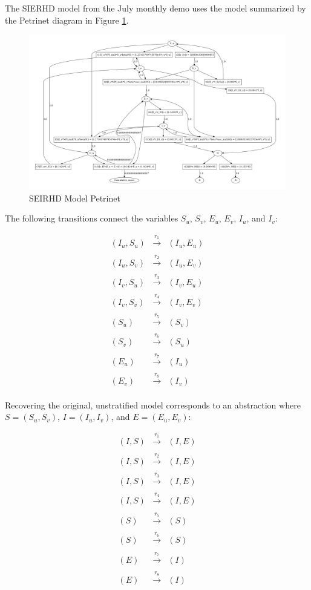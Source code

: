 The SIERHD model from the July monthly demo uses the model summarized by the Petrinet diagram in Figure \ref{fig:seirhd}.

\begin{figure}
    \includegraphics[width=\linewidth]{fig/seirhd}
    \caption{\label{fig:seirhd} SEIRHD Model Petrinet}
\end{figure}

The following transitions connect the variables $S_u$, $S_v$, $E_u$, $E_v$, $I_u$, and $I_v$:

\begin{eqnarray*}
    (I_u, S_u) &\xrightarrow[]{r_1}& (I_u, E_u)\\
    (I_u, S_v) &\xrightarrow[]{r_2}& (I_u, E_v)\\
    (I_v, S_u) &\xrightarrow[]{r_3}& (I_v, E_u)\\
    (I_v, S_v) &\xrightarrow[]{r_4}& (I_v, E_v)\\
    (S_u) &\xrightarrow[]{r_5}& (S_v)\\
    (S_v) &\xrightarrow[]{r_6}& (S_u)\\
    (E_u) &\xrightarrow[]{r_7}& (I_u)\\
    (E_v) &\xrightarrow[]{r_8}& (I_v)
\end{eqnarray*}

Recovering the original, unstratified model corresponds to an abstraction where $S = (S_u, S_v)$, $I = (I_u, I_v)$, and $E = (E_u, E_v)$: 

\begin{eqnarray*}
    (I, S) &\xrightarrow[]{r_1}& (I, E)\\
    (I, S) &\xrightarrow[]{r_2}& (I, E)\\
    (I, S) &\xrightarrow[]{r_3}& (I, E)\\
    (I, S) &\xrightarrow[]{r_4}& (I, E)\\
    (S) &\xrightarrow[]{r_5}& (S)\\
    (S) &\xrightarrow[]{r_6}& (S)\\
    (E) &\xrightarrow[]{r_7}& (I)\\
    (E) &\xrightarrow[]{r_8}& (I)
\end{eqnarray*}

